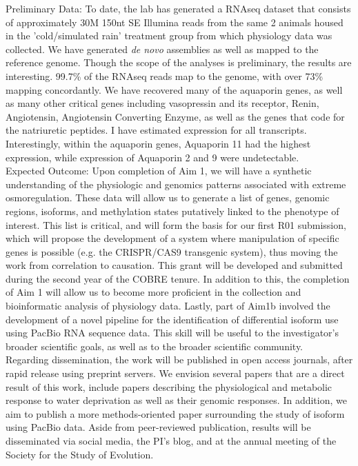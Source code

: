 \documentclass[11pt]{article}
\begin{document}
Preliminary Data: To date, the lab has generated a RNAseq dataset that consists of approximately 30M 150nt SE Illumina reads from the same 2 animals housed in the 'cold/simulated rain' treatment group from which physiology data was collected. We have generated \textit{de novo} assemblies as well as mapped to the reference genome. Though the scope of the analyses is preliminary, the results are interesting. 99.7\% of the RNAseq reads map to the genome, with over 73\% mapping concordantly. We have recovered many of the aquaporin genes, as well as many other critical genes including vasopressin and its receptor, Renin, Angiotensin, Angiotensin Converting Enzyme, as well as the genes that code for the natriuretic peptides. I have estimated expression for all transcripts.  Interestingly, within the aquaporin genes, Aquaporin 11 had the highest expression, while expression of Aquaporin 2 and 9 were undetectable. \\

Expected Outcome: Upon completion of Aim 1, we will have a synthetic understanding of the physiologic and genomics patterns associated with extreme osmoregulation. These data will allow us to generate a list of genes, genomic regions, isoforms, and methylation states putatively linked to the phenotype of interest. This list is critical, and will form the basis for our first R01 submission, which will propose the development of a system where manipulation of specific genes is possible (e.g. the CRISPR/CAS9 transgenic system), thus moving the work from correlation to causation. This grant will be developed and submitted during the second year of the COBRE tenure. In addition to this, the completion of Aim 1 will allow us to become more proficient in the collection and bioinformatic analysis of physiology data. Lastly, part of Aim1b involved the development of a novel pipeline for the identification of differential isoform use using PacBio RNA sequence data. This skill will be useful to the investigator's broader scientific goals, as well as to the broader scientific community.    \\

Regarding dissemination, the work will be published in open access journals, after rapid release using preprint servers. We envision several papers that are a direct result of this work, include papers describing the physiological and metabolic response to water deprivation as well as their genomic responses. In addition, we aim to publish a more methods-oriented paper surrounding the study of isoform using PacBio data. Aside from peer-reviewed publication, results will be disseminated via social media, the PI's blog, and at the annual meeting of the Society for the Study of Evolution. \\       
\end{document}
